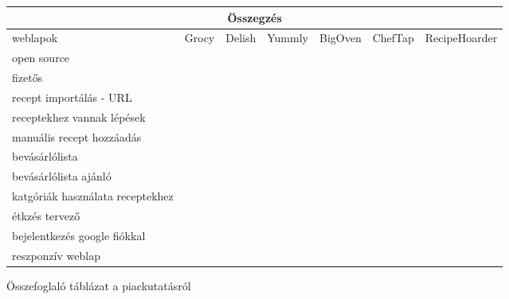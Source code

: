 \documentclass[12pt]{report}
\theoremstyle{definition}
\begin{document}
\noindent
\begin{figure}[H]
	\centering

	\begin{tabular}{p{3cm} | c c c c c | c | @{}}
		\multicolumn{7}{c}{Összegzés}                                                                   \\ \midrule
		weblapok                         & Grocy  & Delish & Yummly & BigOven & ChefTap & RecipeHoarder \\ \cmidrule[2pt](r){2-7}
		open source                      & \cmark & \xmark & \xmark & \xmark  & \xmark  & \xmark \footnotemark\\\cmidrule(r){2-7}
		fizetős                          & \xmark & \xmark & \xmark & \cmark  & \cmark  & \xmark \footnotemark\\\cmidrule(r){2-7}
		recept importálás - URL          & \xmark & \xmark & \xmark & \cmark  & \cmark  & \cmark        \\ \cmidrule(r){2-7}
		receptekhez vannak lépések       & \xmark & \cmark & \cmark & \xmark  & \cmark  & \cmark        \\ \cmidrule(r){2-7}
		manuális recept hozzáadás        & \cmark & \xmark & \xmark & \cmark  & \cmark  & \cmark        \\ \cmidrule(r){2-7}
		bevásárlólista                   & \cmark & \xmark & \cmark & \cmark  & \cmark  & \cmark        \\ \cmidrule(r){2-7}
		bevásárlólista ajánló            & \cmark & \xmark & \xmark & \xmark  & \xmark  & \cmark        \\ \cmidrule(r){2-7}
		katgóriák használata receptekhez & \xmark & \cmark & \cmark & \xmark  & \cmark  & \cmark        \\ \cmidrule(r){2-7}
		étkzés tervező                   & \cmark & \xmark & \cmark & \xmark  & \xmark  & \xmark        \\ \cmidrule(r){2-7}
		bejelentkezés google fiókkal     & \xmark & \cmark & \cmark & \cmark  & \xmark  & \cmark        \\ \cmidrule(r){2-7}
		reszponzív weblap                & \cmark & \xmark & \xmark & \xmark  & \xmark  & \cmark        \\ \bottomrule
	\end{tabular}

	\caption{Összefoglaló táblázat a piackutatásról}
    \label{fig:table}
\end{figure}

\end{document}
